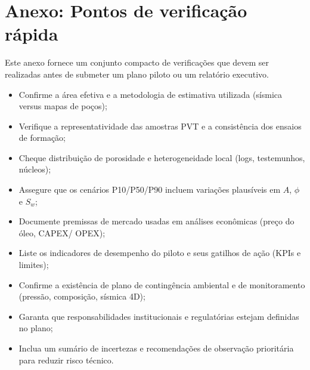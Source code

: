 \documentclass[
  12pt,
  a4paper,
  oneside,
  brazilian,
  sumario=tradicional
]{abntex2}
\begin{document}
\chapter{Anexo: Pontos de verificação rápida}
Este anexo fornece um conjunto compacto de verificações que devem ser realizadas antes de submeter um plano piloto ou um relatório executivo.
\begin{itemize}
  \item Confirme a área efetiva e a metodologia de estimativa utilizada (sísmica versus mapas de poços);
  \item Verifique a representatividade das amostras PVT e a consistência dos ensaios de formação;
  \item Cheque distribuição de porosidade e heterogeneidade local (logs, testemunhos, núcleos);
  \item Assegure que os cenários P10/P50/P90 incluem variações plausíveis em $A$, $\phi$ e $S_w$;
  \item Documente premissas de mercado usadas em análises econômicas (preço do óleo, CAPEX/ OPEX);
  \item Liste os indicadores de desempenho do piloto e seus gatilhos de ação (KPIs e limites); 
  \item Confirme a existência de plano de contingência ambiental e de monitoramento (pressão, composição, sísmica 4D);
  \item Garanta que responsabilidades institucionais e regulatórias estejam definidas no plano;
  \item Inclua um sumário de incertezas e recomendações de observação prioritária para reduzir risco técnico.
\end{itemize}

\postextual

\end{document}
